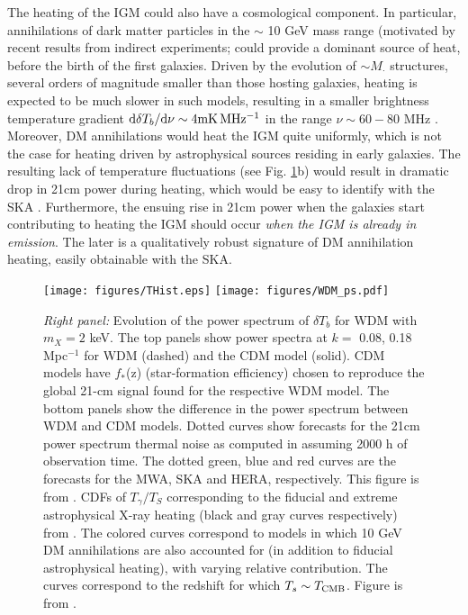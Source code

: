 \documentclass{PoS}
\newcommand{\ud}{{\rm d}}
\begin{document}
The heating of the IGM could also have a cosmological component.  In particular, annihilations of dark matter particles in the $\sim$ 10 GeV mass range (motivated by recent results from indirect experiments; \cite[e.g.][]{2009Natur.458..607A, 2010JCAP...04..014A,2013PhRvL.110n1102A}
could provide a dominant source of heat, before the birth of the first galaxies.  Driven by the evolution of $\sim M_\cdot$ structures, several orders of magnitude smaller than those hosting galaxies, heating is expected to be much slower in such models, resulting in a smaller brightness temperature gradient  $\ud\delta T_b/\ud\nu \sim4 {\rm mK\, MHz^{-1}}$ in the range $\nu \sim 60 - 80$ MHz \citep{2013MNRAS.429.1705V}.  Moreover, DM annihilations would heat the IGM quite uniformly, which is not the case for heating driven by astrophysical sources residing in early galaxies.  The resulting lack of temperature fluctuations (see Fig. \ref{fig:darkmatter}b) would result in dramatic drop in 21cm power during heating, which would be easy to identify with the SKA \citep{2014arXiv1408.1109E}.  Furthermore, the ensuing rise in 21cm power when the galaxies start contributing to heating the IGM should occur {\em when the IGM is already in emission}.  The later is a qualitatively robust signature of DM annihilation heating, easily obtainable with the SKA.



\begin{figure}[htbp]
\begin{center}
\texttt{[image: figures/THist.eps]}
\texttt{[image: figures/WDM\_ps.pdf]}
\caption{{\em Right panel: }Evolution of the power spectrum of $\delta T_b$ for WDM with $m_X = 2$ keV. The top panels show power spectra at
$k =$ 0.08, 0.18 Mpc$^{-1}$ for WDM (dashed) and the CDM model (solid). CDM models have $f_*$(z) (star-formation efficiency) chosen to reproduce the global 21-cm signal found for
the respective WDM model. The bottom panels show the difference in the power spectrum between WDM and CDM models. Dotted curves show forecasts
for the 21cm power spectrum thermal noise as computed in \cite{2014MNRAS.439.3262M} assuming 2000 h of observation time. The dotted green, blue and red curves are
the forecasts for the MWA, SKA and HERA, respectively.  This figure is from \cite{2014MNRAS.438.2664S}.
CDFs of $T_\gamma/T_S$ corresponding to the fiducial and extreme astrophysical X-ray heating (black and gray curves respectively) from \cite{2013MNRAS.431..621M}.  The colored curves correspond to models in which 10 GeV DM annihilations are also accounted for (in addition to fiducial astrophysical heating), with varying relative contribution. The curves correspond to the redshift for which $T_s \sim T_{\rm CMB}$. Figure is from \citep{2014arXiv1408.1109E}.}
\label{fig:darkmatter}
\end{center}
\end{figure}
\end{document}
